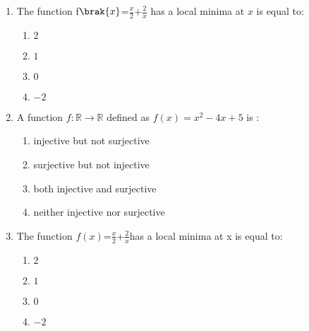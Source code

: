 \begin{enumerate}
\item  The function f$\brak{x}$=$\frac{x}{2}$+$\frac{2}{x}$ has a local minima at $x$ is equal to:                                                                                                                 \begin{enumerate}                                   
\item$2$                                                              
\item$1$      
\item$0$                                                                
\item$-2$                                                       
\end{enumerate}  
                                               
	\item A function $f :\mathbb{R} \rightarrow \mathbb{R}$ defined as $f(x) = x^2 - 4x +5 $ is :
		\begin{enumerate}[label=(\Alph*)]
		\item injective but not surjective
\item surjective but not injective
\item both injective and surjective
\item neither injective nor surjective
\end{enumerate}
\item The function $f(x)$=$\frac{x}{2}$+$\frac{2}{x}$has a local minima at x is equal to:

	\begin{enumerate}[label=(\Alph*)]
                        \item$2$
                        \item$1$
                        \item$0$
                        \item$-2$
                \end{enumerate}

\end{enumerate}
